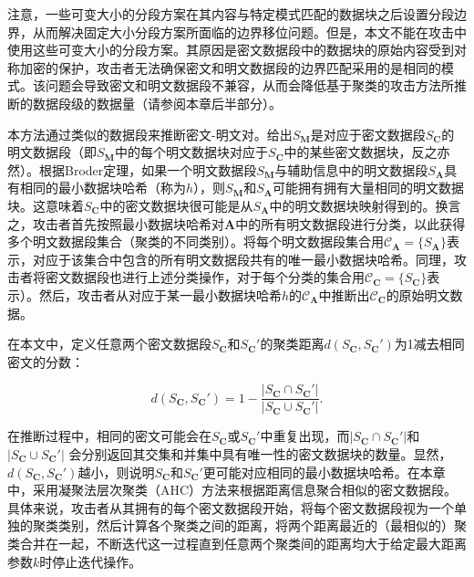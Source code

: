注意，一些可变大小的分段方案在其内容与特定模式匹配的数据块之后设置分段边界，从而解决固定大小分段方案所面临的边界移位问题。但是，本文不能在攻击中使用这些可变大小的分段方案。其原因是密文数据段中的数据块的原始内容受到对称加密的保护，攻击者无法确保密文和明文数据段的边界匹配采用的是相同的模式。该问题会导致密文和明文数据段不兼容，从而会降低基于聚类的攻击方法所推断的数据段级的数据量（请参阅本章后半部分）。
 
本方法通过类似的数据段来推断密文-明文对。给出$S_\mathbf{M}$是对应于密文数据段$S_\mathbf{C}$的明文数据段（即$S_\mathbf{M}$中的每个明文数据块对应于$S_\mathbf{C}$中的某些密文数据块，反之亦然）。根据Broder定理，如果一个明文数据段$S_\mathbf{M}$与辅助信息中的明文数据段$S_\mathbf{A}$具有相同的最小数据块哈希（称为$h$），则$S_\mathbf{M}$和$S_\mathbf{A}$可能拥有拥有大量相同的明文数据块。这意味着$S_\mathbf{C}$中的密文数据块很可能是从$S_\mathbf{A}$中的明文数据块映射得到的。换言之，攻击者首先按照最小数据块哈希对$\mathbf{A}$中的所有明文数据段进行分类，以此获得多个明文数据段集合（聚类的不同类别）。将每个明文数据段集合用$\mathcal{C}_\mathbf{A} = \{ S_\mathbf{A} \}$表示，对应于该集合中包含的所有明文数据段共有的唯一最小数据块哈希。同理，攻击者将密文数据段也进行上述分类操作，对于每个分类的集合用$\mathcal{C}_\mathbf{C} = \{ S_\mathbf{C} \}$表示）。然后，攻击者从对应于某一最小数据块哈希$h$的$\mathcal{C}_\mathbf{A}$中推断出$\mathcal{C}_\mathbf{C}$的原始明文数据。  

在本文中，定义任意两个密文数据段$S_\mathbf{C}$和$S_\mathbf{C}'$的聚类距离$d(S_\mathbf{C},S_\mathbf{C}')$为1减去相同密文的分数：

\begin{equation}
\label{eq:distence}
    d(S_\mathbf{C}, S_\mathbf{C}') = 1 - \frac{|S_\mathbf{C} \cap S_\mathbf{C}'|}{|S_\mathbf{C} \cup S_\mathbf{C}'|}.
\end{equation}

在推断过程中，相同的密文可能会在$S_\mathbf{C}$或$S_\mathbf{C}'$中重复出现，而$|S_\mathbf{C} \cap S_\mathbf{C}'|$和$|S_\mathbf{C} \cup S_\mathbf{C}'|$ 会分别返回其交集和并集中具有唯一性的密文数据块的数量。显然，$d(S_\mathbf{C}, S_\mathbf{C}')$越小，则说明$S_\mathbf{C}$和$S_\mathbf{C}'$更可能对应相同的最小数据块哈希。在本章中，采用凝聚法层次聚类（AHC）方法来根据距离信息聚合相似的密文数据段。具体来说，攻击者从其拥有的每个密文数据段开始，将每个密文数据段视为一个单独的聚类类别，然后计算各个聚类之间的距离，将两个距离最近的（最相似的）聚类合并在一起，不断迭代这一过程直到任意两个聚类间的距离均大于给定最大距离参数$k$时停止迭代操作。
 
